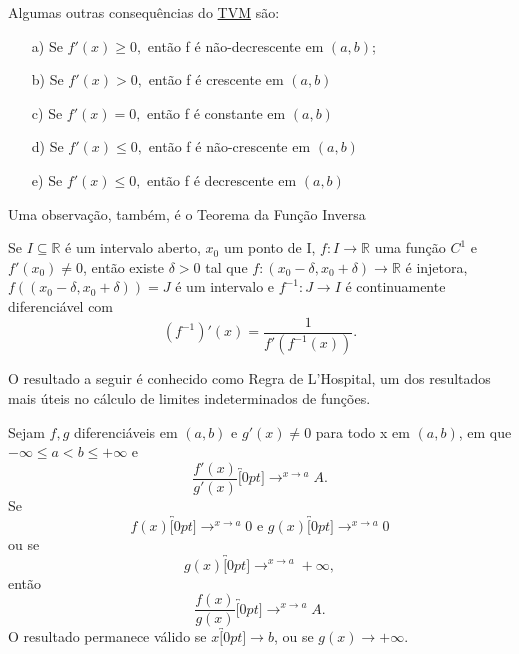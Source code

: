 \documentclass[analysis_notes.tex]{subfiles}
\begin{document}
Algumas outras consequências do \hyperlink{mean_value}{TVM} são:
\begin{crl*}
	\begin{itemize}
		\item[a)] Se \(f'(x)\geq  0,\) então f é não-decrescente em \((a, b)\);
		\item[b)] Se \(f'(x) > 0,\) então f é crescente em \((a, b)\)
		\item[c)]  Se \(f'(x) = 0,\) então f é constante em \((a, b)\)
		\item[d)] Se \(f'(x)\leq  0,\) então f é não-crescente em \((a, b)\)
		\item[e)] Se \(f'(x)\leq  0,\) então f é decrescente em \((a, b)\)
	\end{itemize}
\end{crl*}
Uma observa\c cão, também, é o Teorema da Fun\c cão Inversa
\begin{theorem*}
	Se \(I\subseteq{\mathbb{R}}\) é um intervalo aberto, \(x_{0}\) um ponto de I,
	\(f:I\rightarrow \mathbb{R}\) uma fun\c cão \(C^{1}\) e \(f'(x_{0})\neq 0\), então
	existe \(\delta >0\) tal que \(f:(x_{0}-\delta, x_{0}+\delta )\rightarrow \mathbb{R}\)
	é injetora, \(f((x_{0}-\delta ,x_{0}+\delta )) = J\) é um intervalo e \(f^{-1}:J\rightarrow I\)
	é continuamente diferenciável com
	\[
		(f^{-1})'(x) = \frac{1}{f'(f^{-1}(x))}.
	\]
\end{theorem*}
O resultado a seguir é conhecido como Regra de L'Hospital, um dos resultados
mais úteis no cálculo de limites indeterminados de fun\c cões.
\hypertarget{Lhospital}{
	\begin{theorem*}
		Sejam \(f, g\) diferenciáveis em \((a, b)\) e \(g'(x)\neq0\) para todo
		x em \((a, b)\), em que \(-\infty\leq a < b\leq +\infty\) e
		\[
			\frac{f'(x)}{g'(x)}\overbracket[0pt]{\longrightarrow}^{x\to a}A.
		\]
		Se
		\[
			f(x)\overbracket[0pt]{\longrightarrow}^{x\to a}0\text{ e }g(x)\overbracket[0pt]{\longrightarrow}^{x\to a}0
		\]
		ou se
		\[
			g(x)\overbracket[0pt]{\longrightarrow}^{x\to a}+\infty,
		\]
		então
		\[
			\frac{f(x)}{g(x)}\overbracket[0pt]{\longrightarrow}^{x\to a}A.
		\]
		O resultado permanece válido se \(x\overbracket[0pt]{\longrightarrow}b\), ou se
		\(g(x)\longrightarrow+\infty.\)
	\end{theorem*}
}
\end{document}
